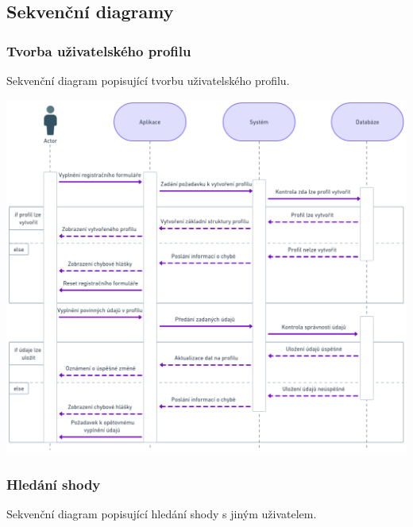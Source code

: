 \documentclass[czech,12pt,a4paper,titlepage]{article}
\begin{document}
\clearpage

\subsection{Sekvenční diagramy}
\subsubsection{Tvorba uživatelského profilu}

Sekvenční diagram popisující tvorbu uživatelského profilu.

\bigskip
\bigskip
\bigskip
\bigskip
\bigskip
\bigskip


\includegraphics[width=1\textwidth, center]{Sequence_diagram _1.png}

\clearpage

\subsubsection{Hledání shody}

Sekvenční diagram popisující hledání shody s jiným uživatelem.

\bigskip
\bigskip
\bigskip
\bigskip
\bigskip
\bigskip
\end{document}
